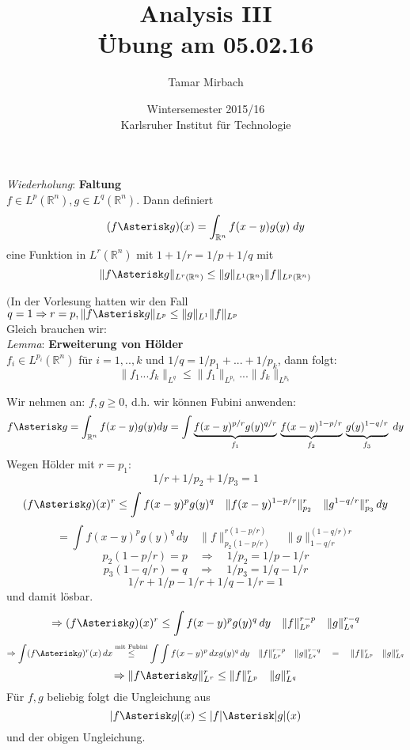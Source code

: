 \documentclass[11pt]{memoir}
\newcommand{\ffg}{f \Asterisk g}
\begin{document}
\title{\textbf{Analysis III}\\ Übung am 05.02.16}
\author{Tamar Mirbach}
\date{Wintersemester 2015/16\\ Karlsruher Institut für Technologie}


\maketitle


\emph{Wiederholung}: \textbf{Faltung} \\
$f \in L^p(\mathbb R^n), g \in L^q(\mathbb R^n)$. Dann definiert
$$(\ffg)(x) = \int_{\mathbb R^n} f(x-y) g(y) \; dy$$
eine Funktion in $L^r(\mathbb R^n)$ mit $1+ 1/r = 1/p + 1/q$ mit
$$\| \ffg\|_{L^r(\mathbb R^n)} \leq \|g\|_{L^1(\mathbb R^n)} \|f\|_{L^p(\mathbb R^n)}$$

$($In der Vorlesung hatten wir den Fall $q = 1 \Rightarrow r=p, \|f \Asterisk g \|_{L^p} \leq \|g\|_{L^1} \|f\|_{L^p}$\\


Gleich brauchen wir: \\
\emph{Lemma}: \textbf{Erweiterung von Hölder} \\
$f_i \in L^{p_i} (\mathbb R^n)$ für $i= 1, .., k$ und $1/q = 1/p_1 + ... + 1/p_k$, dann folgt:
$$\|f_1 ... f_k\|_{L^q} \leq \|f_1\|_{L^{p_1}} ... \|f_k\|_{L^{p_k}}$$

\par\bigskip

Wir nehmen an: $f, g \geq 0$, d.h. wir können Fubini anwenden: \\
$$\ffg = \int_{\mathbb R^n} f(x-y)g(y)dy = \int \underbrace{f(x-y)^{p/r} g(y)^{q/r}}_{f_1} \, \underbrace{f(x-y)^{1-p/r}}_{f_2} \, \underbrace{g(y)^{1-q/r}}_{f_3} \; dy$$
Wegen Hölder mit $r = p_1$:
$$1/r  +1/p_2 + 1/p_3 = 1$$
$$(\ffg)(x)^r \leq \int f(x-y)^p g(y)^q \quad \|f(x-y)^{1-p/r}\|_{p_2}^r \quad \|g^{1-q/r}\|_{p_3}^r \, dy$$
$$ = \int f(x-y)^p g(y) ^q \, dy \quad \|f\|_{p_2(1-p/r)}^{r(1-p/r)} \quad \|g\|_{1-q/r}^{(1-q/r)r}$$
$$p_2(1-p/r) = p \quad \Rightarrow \quad 1/p_2 = 1/p - 1/r $$
$$p_3(1-q/r) = q \quad \Rightarrow \quad 1/p_3 = 1/q - 1/r$$
$$1/r + 1/p - 1/r + 1/q - 1/r= 1$$ und damit lösbar.
$$\Rightarrow (\ffg)(x)^r \leq \int f(x-y)^p g(y)^q\, dy \quad \|f\|_{L^p}^{r-p} \quad \|g\|_{L^q}^{r-q}$$
$$\Rightarrow \int(\ffg)^r(x) \, dx  \stackrel{\text{mit Fubini}}{\leq} \int \int f(x-y)^p \, dx g(y)^q\, dy \quad \|f\|_{L^p}^{r-p} \quad \|g\|_{L^q}^{r-q} \quad = \quad \|f\|_{L^p}^r \quad \|g\|_{L^q}^r$$
$$\Rightarrow \|\ffg\|^r_{L^r} \leq \|f\|_{L^p}^r \quad \|g\|^r_{L^q}$$
Für $f, g$ beliebig folgt die Ungleichung aus
$$|\ffg|(x) \leq |f| \Asterisk |g|(x)$$
und der obigen Ungleichung.
\end{document}
